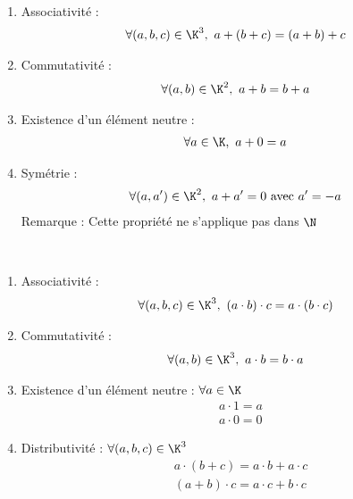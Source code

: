     \begin{graybox}
    \begin{proposition}~
	\begin{enumerate}
		\item Associativité :
		\begin{align*}
            \forall(a, b, c) \in \K^3,\ a + (b + c) = (a + b) + c	
		\end{align*}
		\item Commutativité :
		\begin{align*}
            \forall(a, b) \in \K^2,\ a + b = b + a
		\end{align*}
		\item Existence d'un élément neutre : 
		\begin{align*}
            \forall a \in \K,\ a + 0 = a
		\end{align*}
		\item Symétrie :
		\begin{align*}
            \forall(a, a') \in \K^2,\ a + a' = 0 \textnormal{ avec } a' = -a
		\end{align*}
		Remarque : Cette propriété ne s'applique pas dans $\N$
	\end{enumerate}
\end{proposition}
    \end{graybox}

    \begin{graybox}
    \begin{proposition}~
	\begin{enumerate}
		\item Associativité :
		\begin{align*}
           \forall (a, b, c) \in \K^3,\ (a \cdot b) \cdot c = a \cdot (b \cdot c) 
		\end{align*}
		\item Commutativité :
		\begin{align*}
            \forall (a, b) \in \K^3,\ a \cdot b = b \cdot a
		\end{align*}
		\item Existence d'un élément neutre : $\forall a \in \K$
		\begin{align*}
              &a \cdot 1 = a\\
              & a \cdot 0 = 0
		\end{align*}
		\item Distributivité : $\forall (a, b, c) \in \K^3$
		\begin{align*}
             &a \cdot (b + c) = a \cdot b + a \cdot c \\
             &(a + b) \cdot c = a \cdot c + b \cdot c
		\end{align*}
	\end{enumerate}
\end{proposition}
    \end{graybox}


